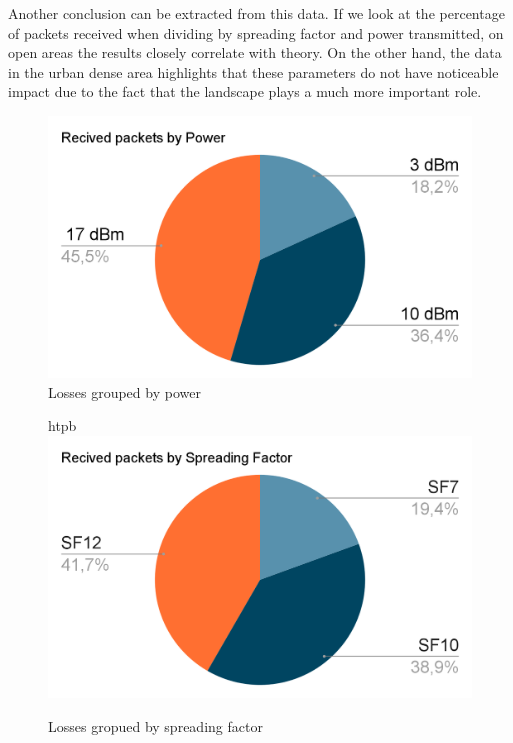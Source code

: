 Another conclusion can be extracted from this data. If we look at the percentage of packets received when dividing by spreading factor and power
transmitted, on open areas the results closely correlate with theory. On the other hand, the data in the urban dense area highlights that 
these parameters do not have noticeable impact due to the fact that the landscape plays a much more important role.
\\
\begin{figure}[htpb]
\centering    
\includegraphics[width=\linewidth]{recivedByPower.png}
\caption{Losses grouped by power}
\label{conc:recivedPow}
\end{figure}
\begin{figure}{htpb}
\includegraphics[width=\linewidth]{recivedBySpreading.png}
\caption{Losses gropued by spreading factor}
\label{conc:recivedSp}
\end{figure}
